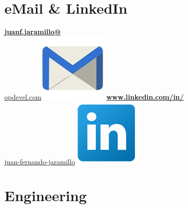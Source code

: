 \begin{aside}
    \section{eMail \& LinkedIn}
    \href{mailto:juanf.jaramillo@opdevel.com}{\small{\textbf{juanf.jaramillo@}\\opdevel.com}\includegraphics[scale=0.07]{img/email2.png}}
    \href{https://www.linkedin.com/in/juan-fernando-jaramillo/}{\textbf{www.linkedin.com/in/}\small{\\juan-fernando-jaramillo}\includegraphics[scale=0.07]{img/Linkedin.png}}
   ~
   ~
   ~
   ~
   ~
   ~
   ~
   ~
   ~
  \section{Engineering}
   ~
\end{aside}
